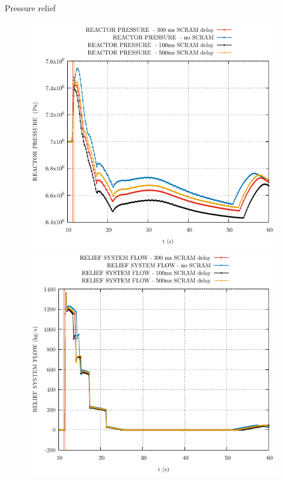 \begin{frame}{Pressure relief}
	
	\begin{figure}
		\centering
		\begin{minipage}{.5\textwidth}
			\centering
			\includegraphics[width=0.7\linewidth]{./graphs/REACTOR PRESSURE _comp.pdf}
		\end{minipage}%
		\begin{minipage}{.5\textwidth}
			\centering
			\includegraphics[width=.7\linewidth]{./graphs/RELIEF SYSTEM FLOW_comp.pdf}
		\end{minipage}
	\end{figure}
	\vspace{-10pt}
	\begin{figure}
		\centering
		\begin{minipage}{.5\textwidth}

\end{minipage}
\end{figure}
\end{frame}
